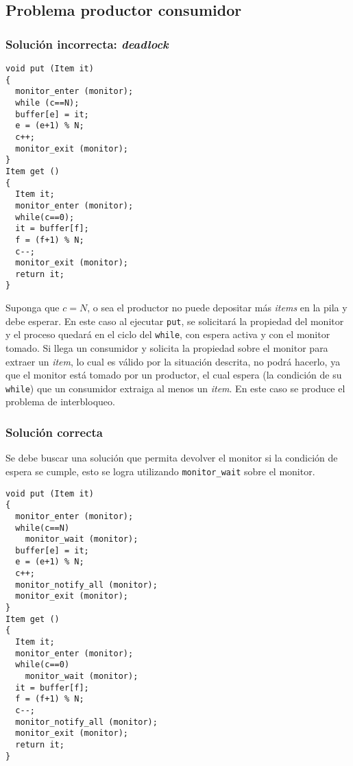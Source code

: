 \subsection{Problema productor consumidor}

\subsubsection{Solución incorrecta: \emph{deadlock}}
\begin{lstlisting}
void put (Item it)
{
  monitor_enter (monitor);
  while (c==N);
  buffer[e] = it;
  e = (e+1) % N;
  c++;
  monitor_exit (monitor);
}
Item get ()
{
  Item it;
  monitor_enter (monitor);
  while(c==0);
  it = buffer[f];
  f = (f+1) % N;
  c--;
  monitor_exit (monitor);
  return it;
}
\end{lstlisting}

Suponga que $c=N$, o sea el productor no puede depositar más \emph{items} en
la pila y debe esperar. En este caso al ejecutar \texttt{put}, se solicitará la
propiedad del monitor y el proceso quedará en el ciclo del \texttt{while}, con
espera activa y con el monitor tomado. Si llega un consumidor y solicita la
propiedad sobre el monitor para extraer un \emph{item}, lo cual es válido por
la situación descrita, no podrá hacerlo, ya que el monitor está tomado por un
productor, el cual espera (la condición de su \texttt{while}) que un consumidor
extraiga al menos un \emph{item}. En este caso se produce el problema de
interbloqueo.

\subsubsection{Solución correcta}
Se debe buscar una solución que permita devolver el monitor si la condición de
espera se cumple, esto se logra utilizando \texttt{monitor\_wait} sobre el
monitor.

\begin{lstlisting}
void put (Item it)
{
  monitor_enter (monitor);
  while(c==N)
    monitor_wait (monitor);
  buffer[e] = it;
  e = (e+1) % N;
  c++;
  monitor_notify_all (monitor);
  monitor_exit (monitor);
}
Item get ()
{
  Item it;
  monitor_enter (monitor);
  while(c==0)
    monitor_wait (monitor);
  it = buffer[f];
  f = (f+1) % N;
  c--;
  monitor_notify_all (monitor);
  monitor_exit (monitor);
  return it;
}
\end{lstlisting}

